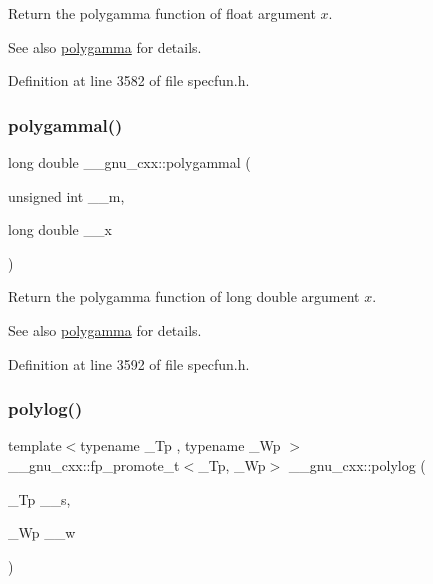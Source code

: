 Return the polygamma function of {\ttfamily float} argument $ x $.

\begin{DoxySeeAlso}{See also}
\hyperlink{group__gnu__math__spec__func_ga65e674e7fe1457e819897e0d608c18b8}{polygamma} for details. 
\end{DoxySeeAlso}


Definition at line 3582 of file specfun.\+h.

\mbox{\label{group__gnu__math__spec__func_gaa6a37359a97ba43f32aa842705c416d4}} 
\subsubsection{\texorpdfstring{polygammal()}{polygammal()}}
{\footnotesize\ttfamily long double \+\_\+\+\_\+gnu\+\_\+cxx\+::polygammal (\begin{DoxyParamCaption}\item[{unsigned int}]{\+\_\+\+\_\+m,  }\item[{long double}]{\+\_\+\+\_\+x }\end{DoxyParamCaption})\hspace{0.3cm}{\ttfamily [inline]}}

Return the polygamma function of {\ttfamily long double} argument $ x $.

\begin{DoxySeeAlso}{See also}
\hyperlink{group__gnu__math__spec__func_ga65e674e7fe1457e819897e0d608c18b8}{polygamma} for details. 
\end{DoxySeeAlso}


Definition at line 3592 of file specfun.\+h.

\mbox{\label{group__gnu__math__spec__func_gabcc5480ad739561c2debd6a8a352084f}} 
\subsubsection{\texorpdfstring{polylog()}{polylog()}\hspace{0.1cm}{\footnotesize\ttfamily [1/2]}}
{\footnotesize\ttfamily template$<$typename \+\_\+\+Tp , typename \+\_\+\+Wp $>$ \\
\+\_\+\+\_\+gnu\+\_\+cxx\+::fp\+\_\+promote\+\_\+t$<$\+\_\+\+Tp, \+\_\+\+Wp$>$ \+\_\+\+\_\+gnu\+\_\+cxx\+::polylog (\begin{DoxyParamCaption}\item[{\+\_\+\+Tp}]{\+\_\+\+\_\+s,  }\item[{\+\_\+\+Wp}]{\+\_\+\+\_\+w }\end{DoxyParamCaption})\hspace{0.3cm}{\ttfamily [inline]}}

